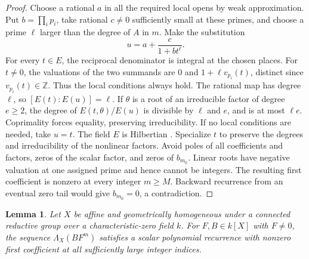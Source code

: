 \documentclass[11pt]{article}
\newtheorem{lemma}[theorem]{Lemma}
\begin{document}
\begin{proof}
Choose a rational \(a\) in all the required local opens by weak
approximation. Put \(b=\prod_i p_i\), take rational \(c\ne0\)
sufficiently small at these primes, and choose a prime \(\ell\)
larger than the degree of \(A\) in \(m\). Make the substitution
\[
                         u=a+\frac{c}{1+b t^\ell}.
\]
For every \(t\in E\), the reciprocal denominator is integral at the
chosen places. For \(t\ne0\), the valuations of the two summands are
\(0\) and \(1+\ell v_{p_i}(t)\), distinct since \(v_{p_i}(t)\in\mathbb Z\).
Thus the local conditions always hold. The rational map has degree
\(\ell\), so \([E(t):E(u)]=\ell\). If \(\theta\) is a root of an
irreducible factor of degree \(e\ge2\), the degree of
\(E(t,\theta)/E(u)\) is divisible by \(\ell\) and \(e\), and is at
most \(\ell e\). Coprimality forces equality, preserving irreducibility.
If no local conditions are needed, take \(u=t\). The field \(E\) is
Hilbertian \cite[Chapter~13]{FriedJarden}. Specialize \(t\) to
preserve the degrees and irreducibility of the nonlinear factors.
Avoid poles of all coefficients and factors, zeros of the scalar
factor, and zeros of \(b_{m_0}\). Linear
roots have negative valuation at one assigned prime and hence
cannot be integers. The resulting first coefficient is nonzero
at every integer \(m\ge M\). Backward recurrence from an eventual
zero tail would give \(b_{m_0}=0\), a contradiction.
\end{proof}

\begin{lemma}\label{lem:shift}
Let \(X\) be affine and geometrically homogeneous under a connected
reductive group over a characteristic-zero field \(k\). For
\(F,B\in k[X]\) with \(F\ne0\), the sequence \(\Lambda_X(BF^m)\)
satisfies a scalar polynomial recurrence with nonzero first
coefficient at all sufficiently large integer indices.
\end{lemma}
\end{document}
